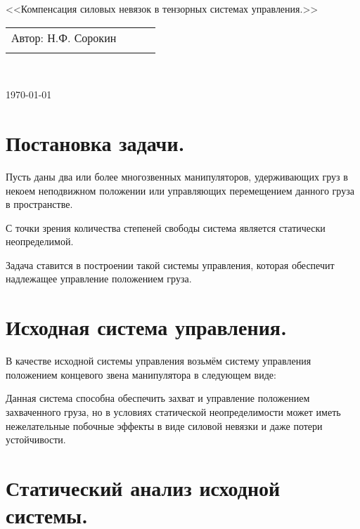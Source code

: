 \documentclass[a4paper]{article}
\begin{document}
\begin{center}
\hfill \break
\hfill\break
\hfill \break
\hfill \break
\hfill \break
\hfill \break
\hfill \break
\hfill \break
\hfill \break
\hfill \break
\large{<<Компенсация силовых невязок в тензорных системах управления.>>}\\
\hfill \break
\hfill \break
\hfill \break
\hfill \break
\hfill \break
\hfill \break
\hfill \break
\hfill \break
\end{center}
 
\normalsize{ 
\begin{tabular}{lccl}
Автор: Н.Ф. Сорокин\\\\
\end{tabular}
}\\
\hfill \break
\hfill \break
\hfill \break
\hfill \break
\hfill \break
\begin{center} \today \end{center}
\thispagestyle{empty} %
\newpage

\section{Постановка задачи.}
Пусть даны два или более многозвенных манипуляторов, удерживающих груз в некоем неподвижном положении или управляющих перемещением данного груза в пространстве. 

С точки зрения количества степеней свободы система является статически неопределимой.

Задача ставится в построении такой системы управления, которая обеспечит надлежащее управление положением груза.

\section{Исходная система управления.}
В качестве исходной системы управления возьмём систему управления положением концевого звена манипулятора в следующем виде:

Данная система способна обеспечить захват и управление положением захваченного груза, но в условиях статической неопределимости может иметь нежелательные побочные эффекты в виде силовой невязки и даже потери устойчивости.

\section{Статический анализ исходной системы.}
\end{document}
